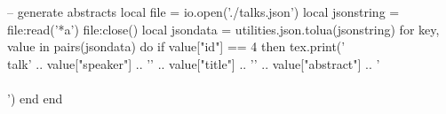 \begin{luacode}
  -- generate abstracts
  local file = io.open('./talks.json')
  local jsonstring = file:read('*a')
  file:close()
  local jsondata =  utilities.json.tolua(jsonstring)
  for key, value in pairs(jsondata) do
    if value["id"] == 4 then 
        tex.print('\\talk{' .. 
          value["speaker"]  .. 
          '}{'              .. 
          value["title"]    .. 
          '}{'              .. 
          value["abstract"] .. 
          '}\\\\[1em]')
    end
  end
\end{luacode}